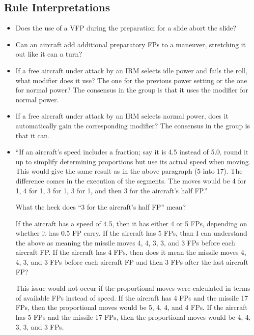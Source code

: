 \documentclass[10pt]{article}
\begin{document}
\subsection{Rule Interpretations}

\begin{itemize}

\item Does the use of a VFP during the preparation for a slide abort the slide?

\item Can an aircraft add additional preparatory FPs to a maneuver, stretching it out like it can a turn?

\item If a free aircraft under attack by an IRM selects idle power and fails the roll, what modifier does it use? The one for the previous power setting or the one for normal power? The consensus in the group is that it uses the modifier for normal power.

\item If a free aircraft under attack by an IRM selects normal power, does it automatically gain the corresponding modifier? The consensus in the group is that it can.

\item “If an aircraft's speed includes a fraction; say it is 4.5 instead of 5.0, round it up to simplify determining proportions but use its actual speed when moving. This would give the same result as in the above paragraph (5 into 17). The difference comes in the execution of the segments. The moves would be 4 for 1, 4 for 1, 3 for 1, 3 for 1, and then 3 for the aircraft's half FP.”

What the heck does “3 for the aircraft's half FP” mean?

If the aircraft has a speed of 4.5, then it has either 4 or 5 FPs, depending on whether it has 0.5 FP carry. If the aircraft has 5 FPs, than I can understand the above as meaning the missile moves 4, 4, 3, 3, and 3 FPs before each aircraft FP. If the aircraft has 4 FPs, then does it mean the missile moves 4, 4, 3, and 3 FPs before each aircraft FP and then 3 FPs after the last aircraft FP?

This issue would not occur if the proportional moves were calculated in terms of available FPs instead of speed. If the aircraft has 4 FPs and the missile 17 FPs, then the proportional moves would be 5, 4, 4, and 4 FPs. If the aircraft has 5 FPs and the missile 17 FPs, then the proportional moves would be 4, 4, 3, 3, and 3 FPs.


\end{itemize}
\end{document}
